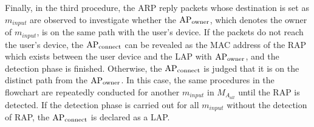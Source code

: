 \documentclass[conference]{IEEEtran}
\newcommand{\tarAP}{\rm AP_{connect}}
\newcommand{\inputAP}{\rm AP_{owner}}
\newcommand{\inputMAC}{m_{input}}
\begin{document}
Finally, in the third procedure, the ARP reply packets whose destination is set as $\inputMAC$ are observed to investigate whether the $\inputAP$, which denotes the owner of $\inputMAC$, is on the same path with the user's device.
If the packets do not reach the user's device, the $\tarAP$ can be revealed as the MAC address of the RAP which exists between the user device and the LAP with  $\inputAP$, and the detection phase is finished.
Otherwise, the $\tarAP$ is judged that it is on the distinct path from the $\inputAP$.
In this case, the same procedures in the flowchart are repeatedly conducted for another $\inputMAC$ in $M_{A_{all}}$ until the RAP is detected.
If the detection phase is carried out for all $\inputMAC$ without the detection of RAP, the $\tarAP$ is declared as a LAP. 
\end{document}
